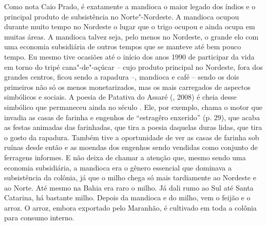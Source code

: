 Como nota Caio Prado, é exatamente a mandioca o maior legado dos índios
e o principal produto de subsistência no Norte"-Nordeste. A mandioca
ocupou durante muito tempo no Nordeste o lugar que o trigo ocupou e
ainda ocupa em muitas áreas. A mandioca talvez seja, pelo menos no
Nordeste, o grande elo com uma economia subsidiária de outros tempos que
se manteve até bem pouco tempo. Eu mesmo tive ocasiões até o início dos
anos 1990 de participar da vida em torno do tripé cana"-de"-açúcar -- cujo
produto principal no Nordeste, fora dos grandes centros, ficou sendo a
rapadura --, mandioca e café -- sendo os dois primeiros não só os menos
monetarizados, mas os mais carregados de aspectos simbólicos e sociais.
A poesia de Patativa do Assaré (, 2008) é cheia desse simbólico
que permaneceu ainda no século . Ele, por exemplo, chama o motor que
invadia as casas de farinha e engenhos de ``estragêro enxerido'' (p.
29), que acaba as festas animadas das farinhadas, que tira a poesia
daquelas duras lidas, que tira o gosto da rapadura. Também tive a
oportunidade de ver as casas de farinha sob ruínas desde então e as
moendas dos engenhos sendo vendidas como conjunto de ferragens informes.
E não deixa de chamar a atenção que, mesmo sendo uma economia
subsidiária, a mandioca era o gênero essencial que dominava a
subsistência da colônia, já que o milho chega só mais tardiamente ao
Nordeste e ao Norte. Até mesmo na Bahia era raro o milho. Já dali rumo
ao Sul até Santa Catarina, há bastante milho. Depois da mandioca e do
milho, vem o feijão e o arroz. O arroz, embora exportado pelo Maranhão,
é cultivado em toda a colônia para consumo interno.

